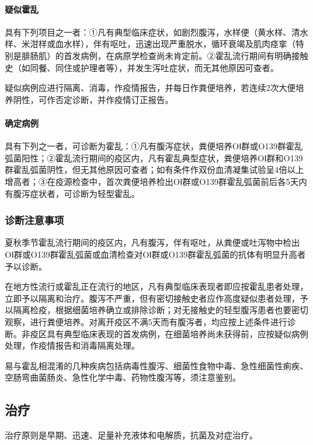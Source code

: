 \paragraph{疑似霍乱}

具有下列项目之一者：①凡有典型临床症状，如剧烈腹泻，水样便（黄水样、清水样、米泔样或血水样），伴有呕吐，迅速出现严重脱水，循环衰竭及肌肉痉挛（特别是腓肠肌）的首发病例，在病原学检查尚未肯定前。②霍乱流行期间有明确接触史（如同餐、同住或护理者等），并发生泻吐症状，而无其他原因可查者。

疑似病例应进行隔离、消毒，作疫情报告，并每日作粪便培养，若连续2次大便培养阴性，可作否定诊断，并作疫情订正报告。

\paragraph{确定病例}

具有下列之一者，可诊断为霍乱：①凡有腹泻症状，粪便培养OⅠ群或O139群霍乱弧菌阳性；②霍乱流行期间的疫区内，凡有霍乱典型症状，粪便培养OⅠ群和O139群霍乱弧菌阴性，但无其他原因可查者；如有条件作双份血清凝集试验呈4倍以上增高者；③在疫源检查中，首次粪便培养检出OⅠ群或O139群霍乱弧菌前后各5天内有腹泻症状者，可诊断为轻型霍乱。

\subsubsection{诊断注意事项}

夏秋季节霍乱流行期间的疫区内，凡有腹泻，伴有呕吐，从粪便或吐泻物中检出OⅠ群或O139群霍乱弧菌或血清检查对OⅠ群或O139群霍乱弧菌的抗体有明显升高者予以诊断。

在地方性流行或霍乱正在流行的地区，凡有典型临床表现者即应按霍乱患者处理，立即予以隔离和治疗。腹泻不严重，但有密切接触史者应作高度疑似患者处理，予以隔离检疫，根据细菌培养确立或排除诊断；对无接触史的轻型腹泻患者也要密切观察，进行粪便培养。对离开疫区不满5天而有腹泻者，均应按上述条件进行诊断。非疫区具有典型临床表现的首发病例，在细菌培养尚未获得前，应按疑似病例处理，作疫情报告和消毒隔离处理。

易与霍乱相混淆的几种疾病包括病毒性腹泻、细菌性食物中毒、急性细菌性痢疾、空肠弯曲菌肠炎、急性化学中毒、药物性腹泻等，须注意鉴别。

\subsection{治疗}

治疗原则是早期、迅速、足量补充液体和电解质，抗菌及对症治疗。


